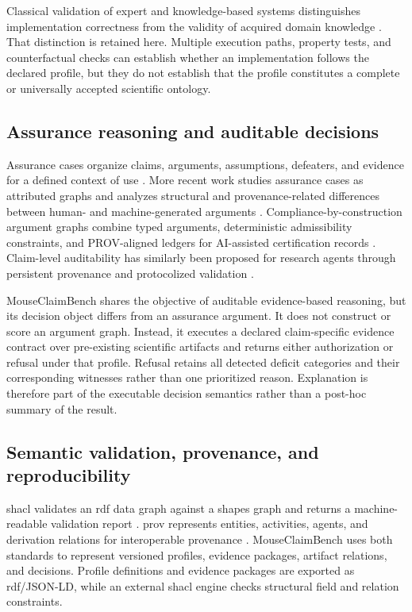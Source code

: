 \documentclass[11pt,a4paper]{article}
\begin{document}
Classical validation of expert and knowledge-based systems distinguishes
implementation correctness from the validity of acquired domain knowledge
\citep{benbasat1989validation,knauf2002validation}. That distinction is
retained here. Multiple execution paths, property tests, and counterfactual
checks can establish whether an implementation follows the declared profile,
but they do not establish that the profile constitutes a complete or
universally accepted scientific ontology.


\subsection{Assurance reasoning and auditable decisions}
\label{subsec:assurance}

Assurance cases organize claims, arguments, assumptions, defeaters, and
evidence for a defined context of use
\citep{batarseh2021assurance,mohamad2021assurance}. More recent work studies
assurance cases as attributed graphs and analyzes structural and
provenance-related differences between human- and machine-generated
arguments \citep{ikhwantri2026assurancegraphs}. Compliance-by-construction
argument graphs combine typed arguments, deterministic admissibility
constraints, and PROV-aligned ledgers for AI-assisted certification records
\citep{moghaddam2026compliance}. Claim-level auditability has similarly been
proposed for research agents through persistent provenance and protocolized
validation \citep{rasheed2026auditability}.

MouseClaimBench shares the objective of auditable evidence-based reasoning,
but its decision object differs from an assurance argument. It does not
construct or score an argument graph. Instead, it executes a declared
claim-specific evidence contract over pre-existing scientific artifacts and
returns either authorization or refusal under that profile. Refusal retains all
detected deficit categories and their corresponding witnesses rather than one
prioritized reason. Explanation is therefore part of the executable decision
semantics rather than a post-hoc summary of the result.


\subsection{Semantic validation, provenance, and reproducibility}
\label{subsec:semantic-standards}

\ac{shacl} validates an \ac{rdf} data graph against a shapes graph and
returns a machine-readable validation report \citep{w3c2017shacl}.
\ac{prov} represents entities, activities, agents, and derivation relations for
interoperable provenance \citep{lebo2013provo}. MouseClaimBench uses both
standards to represent versioned profiles, evidence packages, artifact
relations, and decisions. Profile definitions and evidence packages are
exported as \ac{rdf}/JSON-LD, while an external \ac{shacl} engine checks
structural field and relation constraints.
\end{document}
